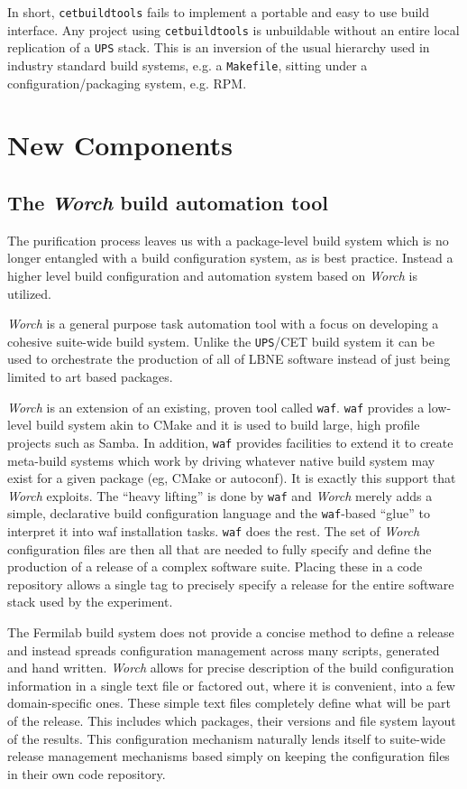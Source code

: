 \documentclass[usletter]{article}
\newcommand{\code}[1]{\texttt{#1}}
\newcommand{\waf}{\code{waf}\xspace}
\newcommand{\worch}{\textit{Worch}\xspace}
\newcommand{\ups}{\code{UPS}\xspace}
\newcommand{\cetbuildtools}{\code{cetbuildtools}\xspace}
\newcommand{\art}{art\xspace}
\begin{document}
In short, \cetbuildtools fails to implement a portable and easy to use
build interface.  Any project using \cetbuildtools is
unbuildable without an entire local replication of a \ups stack. This is
an inversion of the usual hierarchy used in industry standard build systems,
e.g. a \texttt{Makefile}, sitting under a configuration/packaging system, e.g. RPM.

\section{New Components}
\subsection{The \worch build automation tool}

The purification process leaves us with a package-level build system
which is no longer entangled with a build configuration system, as is
best practice.  Instead a higher level build configuration and
automation system based on \worch\cite{worchgh} is utilized.


\worch is a general purpose task automation tool with a focus on
developing a cohesive suite-wide build system.  Unlike the \ups/CET
build system it can be used to orchestrate the production of all of
LBNE software instead of just being limited to \art based packages.

\worch is an extension of an existing, proven tool called
\waf\cite{waf}.  \waf provides a low-level build system akin to CMake
and it is used to build large, high profile projects such as Samba.
In addition, \waf provides facilities to extend it to create
meta-build systems which work by driving whatever native build system
may exist for a given package (eg, CMake or autoconf).  It is exactly
this support that \worch exploits.  The ``heavy lifting'' is done by
\waf and \worch merely adds a simple, declarative build configuration
language and the \waf-based ``glue'' to interpret it into waf
installation tasks.  \waf does the rest.  The set of \worch
configuration files are then all that are needed to fully specify and
define the production of a release of a complex software suite.
Placing these in a code repository allows a single tag to precisely
specify a release for the entire software stack used by the
experiment.

The Fermilab build system does not provide a concise method to define
a release and instead spreads configuration management across many
scripts, generated and hand written.  \worch allows for precise
description of the build configuration information in a single text
file or factored out, where it is convenient, into a few
domain-specific ones.  These simple text files completely define what
will be part of the release.  This includes which packages, their
versions and file system layout of the results.  This configuration
mechanism naturally lends itself to suite-wide release management
mechanisms based simply on keeping the configuration files in their
own code repository.
\end{document}
